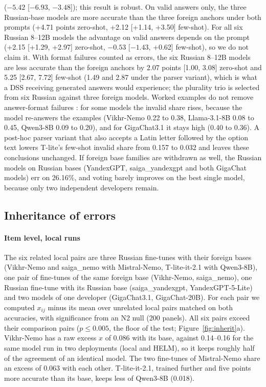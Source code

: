 \documentclass[preprint,12pt,authoryear]{elsarticle}
\begin{document}
($-5.42$ [$-6.93$, $-3.48$]); this result is robust. On valid answers only, the three Russian-base models are more accurate than the three foreign anchors under both prompts (+4.71 points zero-shot, +2.12 [+1.14, +3.50] few-shot). For all six Russian 8--12B models the advantage on valid answers depends on the prompt (+2.15 [+1.29, +2.97] zero-shot, $-0.53$ [$-1.43$, +0.62] few-shot), so we do not claim it. With format failures counted as errors, the six Russian 8--12B models are less accurate than the foreign anchors by 2.07 points [1.00, 3.08] zero-shot and 5.25 [2.67, 7.72] few-shot (1.49 and 2.87 under the parser variant), which is what a DSS receiving generated answers would experience; the plurality trio is selected from six Russian against three foreign models. Worked examples do not remove answer-format failures \citep{sclar2024format}: for some models the invalid share rises, because the model re-answers the examples (Vikhr-Nemo 0.22 to 0.38, Llama-3.1-8B 0.08 to 0.45, Qwen3-8B 0.09 to 0.20), and for GigaChat3.1 it stays high (0.40 to 0.36). A post-hoc parser variant that also accepts a Latin letter followed by the option text lowers T-lite's few-shot invalid share from 0.157 to 0.032 and leaves these conclusions unchanged. If foreign base families are withdrawn as well, the Russian models on Russian bases (YandexGPT, saiga\_yandexgpt and both GigaChat models) err on 26.16\%, and voting barely improves on the best single model, because only two independent developers remain.

\subsection{Inheritance of errors}
\paragraph{Item level, local runs} The six related local pairs are three Russian fine-tunes with their foreign bases (Vikhr-Nemo and saiga\_nemo with Mistral-Nemo, T-lite-it-2.1 with Qwen3-8B), one pair of fine-tunes of the same foreign base (Vikhr-Nemo, saiga\_nemo), one Russian fine-tune with its Russian base (saiga\_yandexgpt, YandexGPT-5-Lite) and two models of one developer (GigaChat3.1, GigaChat-20B). For each pair we computed $x_{ij}$ minus its mean over unrelated local pairs matched on both accuracies, with significance from an N2 null (200 panels). All six pairs exceed their comparison pairs ($p\le0.005$, the floor of the test; Figure~\ref{fig:inherit}a). Vikhr-Nemo has a raw excess $x$ of 0.086 with its base, against 0.14--0.16 for the same model run in two deployments (local and HELM), so it keeps roughly half of the agreement of an identical model. The two fine-tunes of Mistral-Nemo share an excess of 0.063 with each other. T-lite-it-2.1, trained further and five points more accurate than its base, keeps less of Qwen3-8B (0.018).
\end{document}
